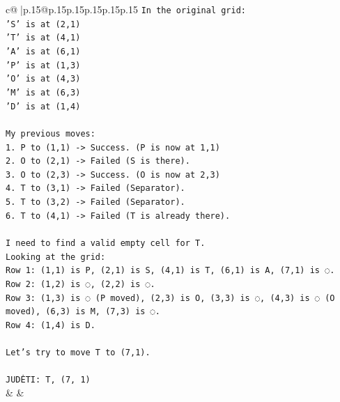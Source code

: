 \documentclass{article}
\begin{document}
{\begin{supertabular}{c@{$\;$}|p{.15\linewidth}@{}p{.15\linewidth}p{.15\linewidth}p{.15\linewidth}p{.15\linewidth}p{.15\linewidth}}
{{{\texttt{In the original grid:} \\
\texttt{'S' is at (2,1)} \\
\texttt{'T' is at (4,1)} \\
\texttt{'A' is at (6,1)} \\
\texttt{'P' is at (1,3)} \\
\texttt{'O' is at (4,3)} \\
\texttt{'M' is at (6,3)} \\
\texttt{'D' is at (1,4)} \\
\\ 
\texttt{My previous moves:} \\
\texttt{1. P to (1,1) {-}> Success. (P is now at 1,1)} \\
\texttt{2. O to (2,1) {-}> Failed (S is there).} \\
\texttt{3. O to (2,3) {-}> Success. (O is now at 2,3)} \\
\texttt{4. T to (3,1) {-}> Failed (Separator).} \\
\texttt{5. T to (3,2) {-}> Failed (Separator).} \\
\texttt{6. T to (4,1) {-}> Failed (T is already there).} \\
\\ 
\texttt{I need to find a valid empty cell for T.} \\
\texttt{Looking at the grid:} \\
\texttt{Row 1: (1,1) is P, (2,1) is S, (4,1) is T, (6,1) is A, (7,1) is ◌.} \\
\texttt{Row 2: (1,2) is ◌, (2,2) is ◌.} \\
\texttt{Row 3: (1,3) is ◌ (P moved), (2,3) is O, (3,3) is ◌, (4,3) is ◌ (O moved), (6,3) is M, (7,3) is ◌.} \\
\texttt{Row 4: (1,4) is D.} \\
\\ 
\texttt{Let's try to move T to (7,1).} \\
\\ 
\texttt{JUDĖTI: T, (7, 1)} \\
            }
        }
    }
    & & \\ \\


\end{supertabular}}
\end{document}
